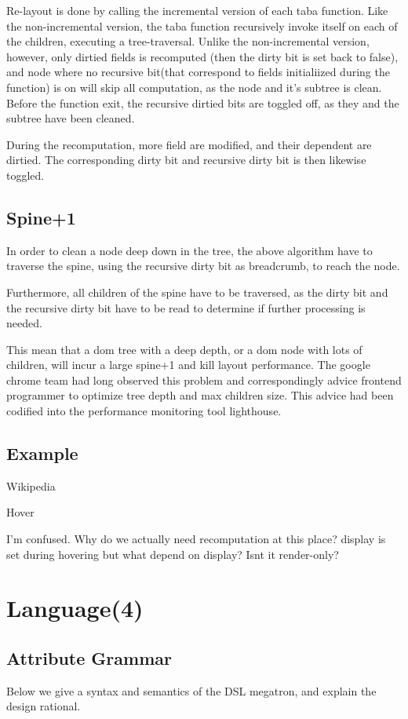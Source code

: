 \documentclass[format=acmsmall, review=false, screen=true]{acmart}
\begin{document}
Re-layout is done by calling the incremental version of each taba function. Like the non-incremental version, the taba function recursively invoke itself on each of the children, executing a tree-traversal. Unlike the non-incremental version, however, only dirtied fields is recomputed (then the dirty bit is set back to false), and node where no recursive bit(that correspond to fields initialiized during the function) is on will skip all computation, as the node and it's subtree is clean. Before the function exit, the recursive dirtied bits are toggled off, as they and the subtree have been cleaned.

During the recomputation, more field are modified, and their dependent are dirtied. The corresponding dirty bit and recursive dirty bit is then likewise toggled.
\subsection{Spine+1}
In order to clean a node deep down in the tree, the above algorithm have to traverse the spine, using the recursive dirty bit as breadcrumb, to reach the node.

Furthermore, all children of the spine have to be traversed, as the dirty bit and the recursive dirty bit have to be read to determine if further processing is needed.

This mean that a dom tree with a deep depth, or a dom node with lots of children, will incur a large spine+1 and kill layout performance. The google chrome team had long observed this problem and correspondingly advice frontend programmer to optimize tree depth and max children size. This advice had been codified into the performance monitoring tool lighthouse.

\subsection{Example}
Wikipedia

Hover

I'm confused. Why do we actually need recomputation at this place? display is set during hovering but what depend on display? Isnt it render-only?

\section{Language(4)}

\subsection{Attribute Grammar}
Below we give a syntax and semantics of the DSL megatron, and explain the design rational.
\end{document}
